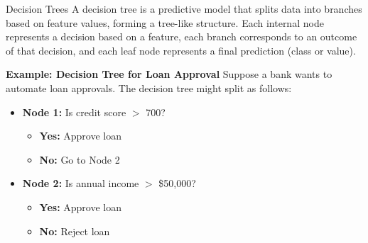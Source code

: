 \documentclass{beamer}
\begin{document}
\begin{frame}{Decision Trees}
    A decision tree is a predictive model that splits data into branches based on feature values, forming a tree-like structure. Each internal node represents a decision based on a feature, each branch corresponds to an outcome of that decision, and each leaf node represents a final prediction (class or value). 
    
    \textbf{Example: Decision Tree for Loan Approval}
    Suppose a bank wants to automate loan approvals. The decision tree might split as follows:

    \begin{itemize}
        \item \textbf{Node 1:} Is credit score $>$ 700?
        \begin{itemize}
            \item \textbf{Yes:} Approve loan
            \item \textbf{No:} Go to Node 2
        \end{itemize}
        \item \textbf{Node 2:} Is annual income $>$ \$50,000?
        \begin{itemize}
            \item \textbf{Yes:} Approve loan
            \item \textbf{No:} Reject loan
        \end{itemize}
    \end{itemize}

\end{frame}
\begin{frame}
    \begin{center}
    \end{center}



\end{frame}
\end{document}
